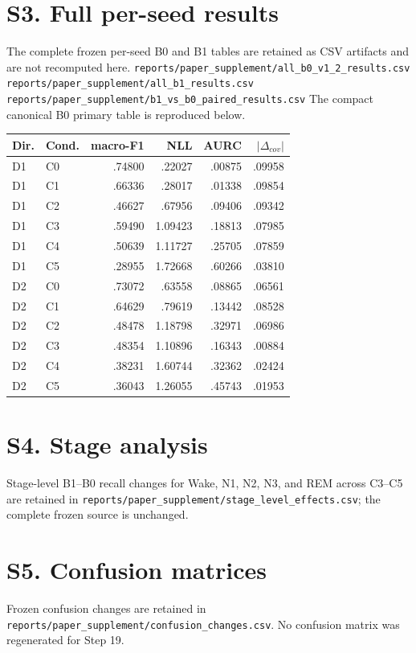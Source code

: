\documentclass[10pt]{article}
\begin{document}
\section*{S3. Full per-seed results}
The complete frozen per-seed B0 and B1 tables are retained as CSV artifacts and are not recomputed here.\newline
\texttt{reports/paper\_supplement/all\_b0\_v1\_2\_results.csv}\newline
\texttt{reports/paper\_supplement/all\_b1\_results.csv}\newline
\texttt{reports/paper\_supplement/b1\_vs\_b0\_paired\_results.csv}\newline
The compact canonical B0 primary table is reproduced below.
\begin{center}\scriptsize\begin{tabular}{llrrrr}\toprule
Dir. & Cond. & macro-F1 & NLL & AURC & $|\Delta_{cov}|$\\\midrule
D1&C0&.74800&.22027&.00875&.09958\\D1&C1&.66336&.28017&.01338&.09854\\D1&C2&.46627&.67956&.09406&.09342\\D1&C3&.59490&1.09423&.18813&.07985\\D1&C4&.50639&1.11727&.25705&.07859\\D1&C5&.28955&1.72668&.60266&.03810\\D2&C0&.73072&.63558&.08865&.06561\\D2&C1&.64629&.79619&.13442&.08528\\D2&C2&.48478&1.18798&.32971&.06986\\D2&C3&.48354&1.10896&.16343&.00884\\D2&C4&.38231&1.60744&.32362&.02424\\D2&C5&.36043&1.26055&.45743&.01953\\\bottomrule\end{tabular}\end{center}

\section*{S4. Stage analysis}
Stage-level B1--B0 recall changes for Wake, N1, N2, N3, and REM across C3--C5 are retained in \texttt{reports/paper\_supplement/stage\_level\_effects.csv}; the complete frozen source is unchanged.

\section*{S5. Confusion matrices}
Frozen confusion changes are retained in \texttt{reports/paper\_supplement/confusion\_changes.csv}. No confusion matrix was regenerated for Step 19.
\end{document}
